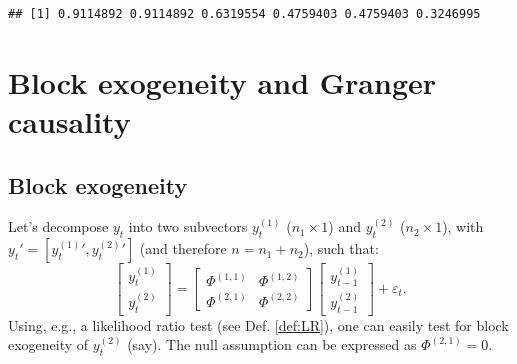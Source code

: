 \documentclass[
  12pt,
]{book}
\newenvironment{Shaded}{\begin{snugshade}}{\end{snugshade}}
\newcommand{\AttributeTok}[1]{\textcolor[rgb]{0.77,0.63,0.00}{#1}}
\newcommand{\CommentTok}[1]{\textcolor[rgb]{0.56,0.35,0.01}{\textit{#1}}}
\newcommand{\DecValTok}[1]{\textcolor[rgb]{0.00,0.00,0.81}{#1}}
\newcommand{\FunctionTok}[1]{\textcolor[rgb]{0.00,0.00,0.00}{#1}}
\newcommand{\NormalTok}[1]{#1}
\newcommand{\OtherTok}[1]{\textcolor[rgb]{0.56,0.35,0.01}{#1}}
\newcommand{\SpecialCharTok}[1]{\textcolor[rgb]{0.00,0.00,0.00}{#1}}
\theoremstyle{definition}
\theoremstyle{definition}
\theoremstyle{definition}
\theoremstyle{definition}
\theoremstyle{remark}
\begin{document}
\begin{Shaded}
\end{Shaded}

\begin{verbatim}
## [1] 0.9114892 0.9114892 0.6319554 0.4759403 0.4759403 0.3246995
\end{verbatim}

\hypertarget{BlockGranger}{%
\section{Block exogeneity and Granger causality}\label{BlockGranger}}

\hypertarget{block-exogeneity}{%
\subsection{Block exogeneity}\label{block-exogeneity}}

Let's decompose \(y_t\) into two subvectors \(y^{(1)}_{t}\) (\(n_1 \times 1\)) and \(y^{(2)}_{t}\) (\(n_2 \times 1\)), with \(y_t' = [{y^{(1)}_{t}}',{y^{(2)}_{t}}']\) (and therefore \(n=n_1 +n_2\)), such that:
\[
\left[
\begin{array}{c}
y^{(1)}_{t}\\
y^{(2)}_{t}
\end{array}
\right] = \left[
\begin{array}{cc}
\Phi^{(1,1)} & \Phi^{(1,2)}\\
\Phi^{(2,1)} & \Phi^{(2,2)}
\end{array}
\right]
\left[
\begin{array}{c}
y^{(1)}_{t-1}\\
y^{(2)}_{t-1}
\end{array}
\right] + \varepsilon_t.
\]
Using, e.g., a likelihood ratio test (see Def. \ref{def:LR}), one can easily test for block exogeneity of \(y_t^{(2)}\) (say). The null assumption can be expressed as \(\Phi^{(2,1)}=0\).
\end{document}
